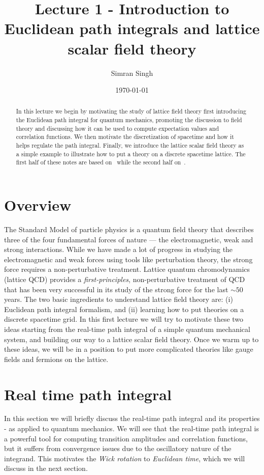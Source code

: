 \documentclass[11pt]{article}
\title{Lecture 1 - Introduction to Euclidean path integrals and lattice scalar field theory}
\author{Simran Singh}
\date{\today}
\theoremstyle{definition}
\begin{document}
\maketitle

\begin{abstract}
  In this lecture we begin by motivating the study of lattice field theory first introducing the Euclidean path integral for quantum mechanics, promoting the discussion to field theory and discussing how it can be used to compute expectation values and correlation functions. We then motivate the discretization of spacetime and how it helps regulate the path integral.
  Finally, we introduce the lattice scalar field theory as a simple example to illustrate how to put a theory on a discrete spacetime lattice. The first half of these notes are based on~\cite{wiese2009lattice} while the second half on~\cite{rothe2012lattice}.
\end{abstract}

\section{Overview}
  The Standard Model of particle physics is a quantum field theory that describes three of the four fundamental forces of nature — the electromagnetic, weak and strong interactions. While we have made a lot of progress in studying the electromagnetic and weak forces using tools like perturbation theory, the strong force requires a non-perturbative treatment. Lattice quantum chromodynamics (lattice QCD) provides a \textit{first-principles}, non-perturbative treatment of QCD that has been very successful in its study of the strong force for the last $\sim 50$ years. The two basic ingredients to understand lattice field theory are: (i) Euclidean path integral formalism, and (ii) learning how to put theories on a discrete spacetime grid. In this first lecture we will try to motivate these two ideas starting from the real-time path integral of a simple quantum mechanical system, and building our way to a lattice scalar field theory. Once we warm up to these ideas, we will be in a position to put more complicated theories like gauge fields and fermions on the lattice.


\section{Real time path integral}
In this section we will briefly discuss the real-time path integral and its properties - as applied to quantum mechanics. We will see that the real-time path integral is a powerful tool for computing transition amplitudes and correlation functions, but it suffers from convergence issues due to the oscillatory nature of the integrand. This motivates the \textit{Wick rotation} to \textit{Euclidean time}, which we will discuss in the next section.
\end{document}

